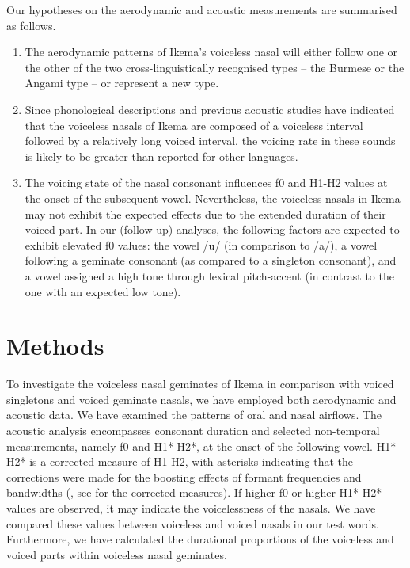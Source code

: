 \documentclass[output=paper]{langscibook}
\begin{document}
Our hypotheses on the aerodynamic and acoustic measurements are summa\-rised as follows.

\begin{enumerate}
\item The aerodynamic patterns of Ikema’s voiceless nasal will either follow one or the other of the two cross-linguistically recognised types – the Burmese or the Angami type – or represent a new type.
\item Since phonological descriptions and previous acoustic studies have indicated that the voiceless nasals of Ikema are composed of a voiceless interval followed by a relatively long voiced interval, the voicing rate in these sounds is likely to be greater than reported for other languages.
\item The voicing state of the nasal consonant influences f0 and H1-H2 values at the onset of the subsequent vowel. Nevertheless, the voiceless nasals in Ikema may not exhibit the expected effects due to the extended duration of their voiced part. In our (follow-up) analyses, the following factors are expected to exhibit elevated f0 values: the vowel /u/ (in comparison to  \mbox{/a/}), a vowel following a geminate consonant (as compared to a singleton consonant), and a vowel assigned a high tone through lexical pitch-accent (in contrast to the one with an expected low tone).
\end{enumerate}

\section{Methods}
\label{sec:shinohara:3}
To investigate the voiceless nasal geminates of Ikema in comparison with voiced singletons and voiced geminate nasals, we have employed both aerodynamic and acoustic data. We have examined the patterns of oral and nasal airflows. The acoustic analysis encompasses consonant duration and selected non-temporal measurements, namely f0 and H1*-H2*, at the onset of the following vowel. H1*-H2* is a corrected measure of H1-H2, with asterisks indicating that the corrections were made for the boosting effects of formant frequencies and bandwidths (\citealt{IseliEtAl2007}, see \citealt{StevensHanson1995} for the corrected measures). If higher f0 or higher H1*-H2* values are observed, it may indicate the voicelessness of the nasals. We have compared these values between voiceless and voiced nasals in our test words. Furthermore, we have calculated the durational proportions of the voiceless and voiced parts within voiceless nasal geminates.
\end{document}
